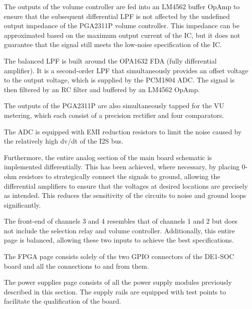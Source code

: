 The outputs of the volume controller are fed into an LM4562 buffer OpAmp to ensure that the subsequent differential LPF is not affected by the undefined output impedance of the PGA2311P volume controller. This impedance can be approximated based on the maximum output current of the IC, but it does not guarantee that the signal still meets the low-noise specification of the IC.

The balanced LPF is built around the OPA1632 FDA (fully differential amplifier). It is a second-order LPF that simultaneously provides an offset voltage to the output voltage, which is supplied by the PCM1804 ADC. The signal is then filtered by an RC filter and buffered by an LM4562 OpAmp.

The outputs of the PGA2311P are also simultaneously tapped for the VU metering, which each consist of a precision rectifier and four comparators.

The ADC is equipped with EMI reduction resistors to limit the noise caused by the relatively high dv/dt of the I2S bus.


Furthermore, the entire analog section of the main board schematic is implemented differentially. This has been achieved, where necessary, by placing 0-ohm resistors to strategically connect the signals to ground, allowing the differential amplifiers to ensure that the voltages at desired locations are precisely as intended. 
This reduces the sensitivity of the circuits to noise and ground loops significantly.

The front-end of channels 3 and 4 resembles that of channels 1 and 2 but does not include the selection relay and volume controller. Additionally, this entire page is balanced, allowing these two inputs to achieve the best specifications.



The FPGA page consists solely of the two GPIO connectors of the DE1-SOC board and all the connections to and from them.

The power supplies page consists of all the power supply modules previously described in this section. The supply rails are equipped with test points to facilitate the qualification of the board.
